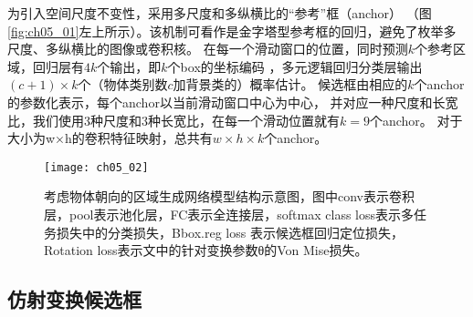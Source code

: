 为引入空间尺度不变性，采用多尺度和多纵横比的“参考”框（anchor）
（图\ref{fig:ch05_01}左上所示）。该机制可看作是金字塔型参考框的回归，避免了枚举多尺度、多纵横比的图像或卷积核。
在每一个滑动窗口的位置，同时预测$k$个参考区域，回归层有$4k$个输出，即$k$个box的坐标编码
，多元逻辑回归分类层输出$(c+1)×k$个（物体类别数$c$加背景类的）概率估计。
候选框由相应的$k$个anchor的参数化表示，每个anchor以当前滑动窗口中心为中心，
并对应一种尺度和长宽比，我们使用3种尺度和3种长宽比，在每一个滑动位置就有$k=9$个anchor。
对于大小为w×h的卷积特征映射，总共有$w \times h\times k$个anchor。

\begin{figure}[!htbp]
\centering
\texttt{[image: ch05\_02]}
\caption{考虑物体朝向的区域生成网络模型结构示意图，图中conv表示卷积层，pool表示池化层，FC表示全连接层，softmax class loss表示多任务损失中的分类损失，Bbox.reg loss 表示候选框回归定位损失，Rotation loss表示文中的针对变换参数θ的Von Mise损失。}
\label{fig:ch05_02}
\end{figure} 

\subsection{仿射变换候选框}
 
